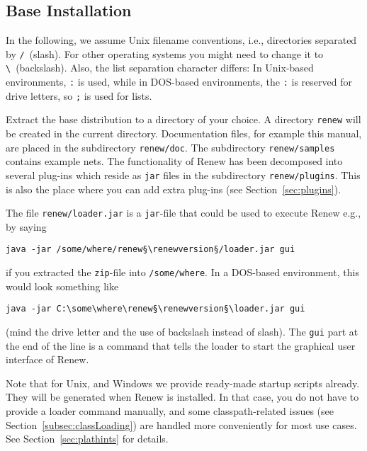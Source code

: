 
\subsection{Base Installation}

In the following, we assume Unix filename conventions, i.e.,
directories separated by \texttt{/}~(slash). For other
operating systems you might need to change it to
\verb:\:~(backslash).
Also, the list separation character differs:
In Unix-based environments, \texttt{:} is used, while in
DOS-based environments, the \texttt{:} is reserved for drive
letters, so \texttt{;} is used for lists.

Extract the base distribution to a directory of your choice.
A directory \texttt{renew\renewversion} will be created
in the current directory. Documentation files, 
for example this manual,
are placed in the subdirectory 
\texttt{renew\renewversion/doc}. The subdirectory 
\texttt{renew\renewversion/samples} contains
example nets. 
The functionality of Renew has been decomposed into several
plug-ins which reside as \texttt{jar} files in the subdirectory
\texttt{renew\renewversion/plugins}. This is also the place where
you can add extra plug-ins (see Section~\ref{sec:plugins}).

The file 
\texttt{renew\renewversion/loader.jar} is a
\texttt{jar}-file that could be used to execute Renew
e.g., by saying
\begin{lstlisting}[style=xnonfloating]
  java -jar /some/where/renew§\renewversion§/loader.jar gui
\end{lstlisting}
if you extracted the \texttt{zip}-file into \texttt{/some/where}.
In a DOS-based environment, this would look something like
\begin{lstlisting}[style=xnonfloating]
  java -jar C:\some\where\renew§\renewversion§\loader.jar gui
\end{lstlisting}
(mind the drive letter and the use of backslash instead of slash).
The \texttt{gui} part at the end of the line is a command that
tells the loader to start the graphical user interface of Renew.

Note that for
Unix, and Windows
we provide ready-made startup scripts already.
They will be generated when Renew is installed. 
In that case, you do not have to provide a loader command
manually, and some classpath-related issues (see
Section~\ref{subsec:classLoading}) are handled more
conveniently for most use cases.
See Section~\ref{sec:plathints} for details.


